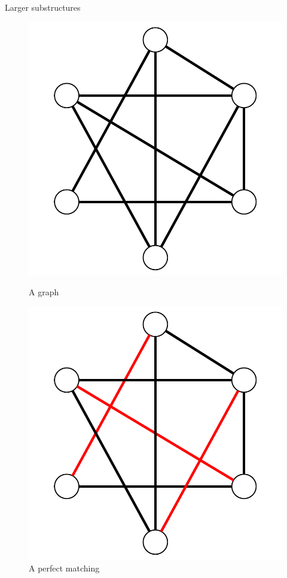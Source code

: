 \documentclass{beamer}
\theoremstyle{plain}
\begin{document}
	\begin{frame}{Larger substructures}
		\begin{figure}
			\begin{overprint}
				\centering\includegraphics[scale=.5]{6.pdf}\caption{A graph}
				\centering\includegraphics[scale=.5]{matching.pdf}\caption{A perfect matching}

\end{overprint}
\end{figure}
\end{frame}
\end{document}
